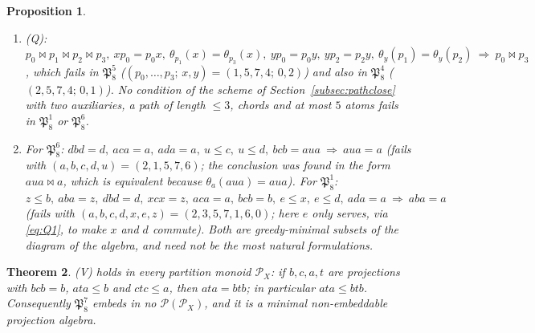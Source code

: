 \documentclass[11pt]{amsart}
\newtheorem{theorem}{Theorem}[section]
\newtheorem{proposition}[theorem]{Proposition}
\theoremstyle{definition}
\renewcommand{\P}{\mathcal{P}}
\newcommand{\mt}{\bowtie}   %
\begin{document}
\begin{proposition}
\begin{enumerate}[label=\textup{(\alph*)},nosep]
\begin{align*}
&xp_0=p_0x,\ xp_2=p_2x,\ \theta_{p_1}(x)=\theta_{p_3}(x),\ \theta_x(p_2)=\theta_x(p_3)\quad(\mathfrak P_8^4),\\
&xp_1=p_1x,\ xp_2=p_2x,\ \theta_x(p_0)=\theta_x(p_2),\ \theta_{p_1}(x)=\theta_{p_3}(x)\quad(\mathfrak P_8^2);
\end{align*}
the two of size $5$ are $xp_0=p_0x,\ xp_1=p_1x,\ xp_2=p_2x,\ \theta_x(p_0)=\theta_x(p_2),\ \theta_x(p_1)=\theta_x(p_3)$ and its reversal ($\mathfrak P_8^2$). All of them combine two commutation atoms, one ``seen alike'' atom for two vertices of the same parity and one ``sees alike'' atom.
\item \textup{(Q)}: $p_0\mt p_1\mt p_2\mt p_3,\ xp_0=p_0x,\ \theta_{p_1}(x)=\theta_{p_3}(x),\ yp_0=p_0y,\ yp_2=p_2y,\ \theta_y(p_1)=\theta_y(p_2)\ \Longrightarrow\ p_0\mt p_3$, which fails in $\mathfrak P_8^5$ ($(p_0,\dots,p_3;\,x,y)=(1,5,7,4;\,0,2)$) and also in $\mathfrak P_8^4$ ($(2,5,7,4;\,0,1)$). No condition of the scheme of Section~\ref{subsec:pathclose} with two auxiliaries, a path of length $\le3$, chords and at most $5$ atoms fails in $\mathfrak P_8^1$ or $\mathfrak P_8^6$.
\item For $\mathfrak P_8^6$: $dbd=d,\ aca=a,\ ada=a,\ u\le c,\ u\le d,\ bcb=aua\ \Longrightarrow\ aua=a$ (fails with $(a,b,c,d,u)=(2,1,5,7,6)$; the conclusion was found in the form $aua\mt a$, which is equivalent because $\theta_a(aua)=aua$). For $\mathfrak P_8^1$: $z\le b,\ aba=z,\ dbd=d,\ xcx=z,\ aca=a,\ bcb=b,\ e\le x,\ e\le d,\ ada=a\ \Longrightarrow\ aba=a$ (fails with $(a,b,c,d,x,e,z)=(2,3,5,7,1,6,0)$; here $e$ only serves, via \eqref{eq:Q1}, to make $x$ and $d$ commute). Both are greedy-minimal subsets of the diagram of the algebra, and need not be the most natural formulations.
\end{enumerate}
\end{proposition}


\begin{theorem}\label{thm:V}
(V) holds in every partition monoid $\P_X$: if $b,c,a,t$ are projections with $bcb=b$, $ata\le b$ and $ctc\le a$, then $ata=btb$; in particular $ata\le btb$. Consequently $\mathfrak P_8^7$ embeds in no $\P(\P_X)$, and it is a minimal non-embeddable projection algebra.
\end{theorem}
\end{document}
